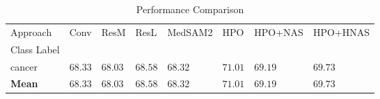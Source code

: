 \begin{table}
\caption{Performance Comparison}
\label{tab:results}
\begin{tabular}{llllllll}
\toprule
Approach & Conv & ResM & ResL & MedSAM2 & HPO & HPO+NAS & HPO+HNAS \\
Class Label &  &  &  &  &  &  &  \\
\midrule
cancer & $68.33$ & $68.03$ & $68.58$ & $68.32$ & $\mathbf{71.01}$ & $69.19$ & $69.73$ \\
\textbf{Mean} & $68.33$ & $68.03$ & $68.58$ & $68.32$ & $\mathbf{71.01}$ & $69.19$ & $69.73$ \\
\bottomrule
\end{tabular}
\end{table}
